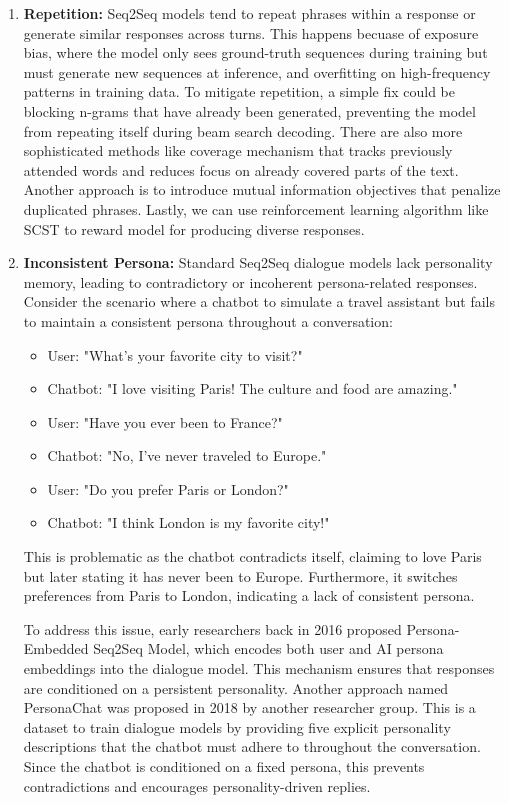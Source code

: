 \documentclass[10pt]{article}
\begin{document}
\begin{description}
\begin{enumerate}
    \item \textbf{Repetition:} Seq2Seq models tend to repeat phrases within a response or generate similar responses across turns. This happens becuase of exposure bias, 
    where the model only sees ground-truth sequences during training but must generate new sequences at inference, and overfitting on high-frequency patterns in training data.
    To mitigate repetition, a simple fix could be blocking n-grams that have already been generated, preventing the model from repeating itself during beam search decoding.
    There are also more sophisticated methods like coverage mechanism that tracks previously attended words and reduces focus on already covered parts of the text. 
    Another approach is to introduce mutual information objectives that penalize duplicated phrases. Lastly, we can use reinforcement learning algorithm like SCST to 
    reward model for producing diverse responses.
    
    \item \textbf{Inconsistent Persona:} Standard Seq2Seq dialogue models lack personality memory, leading to contradictory or incoherent persona-related responses.
    Consider the scenario where a chatbot to simulate a travel assistant but fails to maintain a consistent persona throughout a conversation:

    \begin{itemize}
        \item User: "What’s your favorite city to visit?"
        \item Chatbot: "I love visiting Paris! The culture and food are amazing."
        \item User: "Have you ever been to France?"
        \item Chatbot: "No, I’ve never traveled to Europe."
        \item User: "Do you prefer Paris or London?"
        \item Chatbot: "I think London is my favorite city!"
    \end{itemize}

    This is problematic as the chatbot contradicts itself, claiming to love Paris but later stating it has never been to Europe.
    Furthermore, it switches preferences from Paris to London, indicating a lack of consistent persona. 
    
    To address this issue, early researchers back in 2016 proposed Persona-Embedded Seq2Seq Model, which encodes both user and AI persona embeddings into the dialogue model.
    This mechanism ensures that responses are conditioned on a persistent personality. Another approach named PersonaChat was proposed in 2018 by another researcher group.
    This is a dataset to train dialogue models by providing five explicit personality descriptions that the chatbot must adhere to throughout the conversation.
    Since the chatbot is conditioned on a fixed persona, this prevents contradictions and encourages personality-driven replies.

\end{enumerate}

\end{description}
\end{document}
